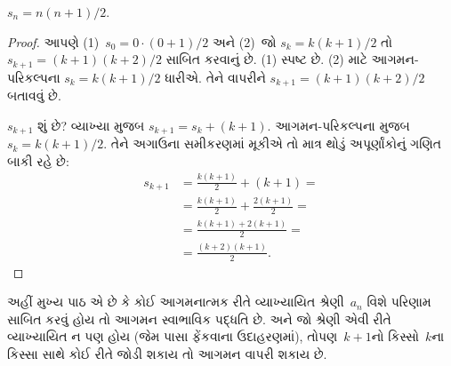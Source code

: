 \documentclass[../../../include/open-logic-section]{subfiles}
\begin{document}
\begin{prop}
  $s_n = n(n+1)/2$.
\end{prop}

\begin{proof}
  આપણે (1)~$s_0 = 0\cdot(0 + 1)/2$ અને (2)~જો $s_k =
  k(k+1)/2$ તો $s_{k+1} = (k+1)(k+2)/2$ સાબિત કરવાનું છે.
  (1) સ્પષ્ટ છે. (2) માટે આગમન-પરિકલ્પના $s_k = k(k+1)/2$
  ધારીએ. તેને વાપરીને $s_{k+1} = (k+1)(k+2)/2$ બતાવવું છે.

  $s_{k+1}$ શું છે? વ્યાખ્યા મુજબ $s_{k+1} = s_k + (k+1)$.
  આગમન-પરિકલ્પના મુજબ $s_k = k(k+1)/2$. તેને અગાઉના
  સમીકરણમાં મૂકીએ તો માત્ર થોડું અપૂર્ણાંકોનું ગણિત બાકી રહે છે:
  \begin{align*}
    s_{k+1} & = \frac{k(k+1)}{2} + (k+1) = {}\\
    & = \frac{k(k+1)}{2} + \frac{2(k+1)}{2} = {}\\
    & = \frac{k(k+1) + 2(k+1)}{2} = {}\\
    & = \frac{(k+2)(k+1)}{2}.
  \end{align*}
\end{proof}

અહીં મુખ્ય પાઠ એ છે કે કોઈ આગમનાત્મક રીતે વ્યાખ્યાયિત
શ્રેણી~$a_n$ વિશે પરિણામ સાબિત કરવું હોય તો આગમન
સ્વાભાવિક પદ્ધતિ છે. અને જો શ્રેણી એવી રીતે વ્યાખ્યાયિત
ન પણ હોય (જેમ પાસા ફેંકવાના ઉદાહરણમાં), તોપણ~$k+1$નો
કિસ્સો~$k$ના કિસ્સા સાથે કોઈ રીતે જોડી શકાય તો આગમન
વાપરી શકાય છે.
\end{document}
